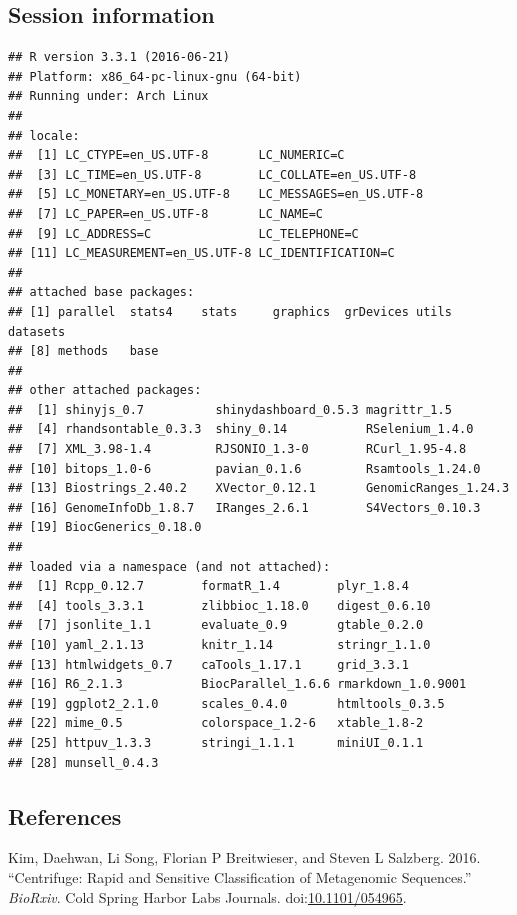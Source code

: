 \documentclass[]{article}
\begin{document}
\subsection{Session information}\label{session-information}

\begin{verbatim}
## R version 3.3.1 (2016-06-21)
## Platform: x86_64-pc-linux-gnu (64-bit)
## Running under: Arch Linux
## 
## locale:
##  [1] LC_CTYPE=en_US.UTF-8       LC_NUMERIC=C              
##  [3] LC_TIME=en_US.UTF-8        LC_COLLATE=en_US.UTF-8    
##  [5] LC_MONETARY=en_US.UTF-8    LC_MESSAGES=en_US.UTF-8   
##  [7] LC_PAPER=en_US.UTF-8       LC_NAME=C                 
##  [9] LC_ADDRESS=C               LC_TELEPHONE=C            
## [11] LC_MEASUREMENT=en_US.UTF-8 LC_IDENTIFICATION=C       
## 
## attached base packages:
## [1] parallel  stats4    stats     graphics  grDevices utils     datasets 
## [8] methods   base     
## 
## other attached packages:
##  [1] shinyjs_0.7          shinydashboard_0.5.3 magrittr_1.5        
##  [4] rhandsontable_0.3.3  shiny_0.14           RSelenium_1.4.0     
##  [7] XML_3.98-1.4         RJSONIO_1.3-0        RCurl_1.95-4.8      
## [10] bitops_1.0-6         pavian_0.1.6         Rsamtools_1.24.0    
## [13] Biostrings_2.40.2    XVector_0.12.1       GenomicRanges_1.24.3
## [16] GenomeInfoDb_1.8.7   IRanges_2.6.1        S4Vectors_0.10.3    
## [19] BiocGenerics_0.18.0 
## 
## loaded via a namespace (and not attached):
##  [1] Rcpp_0.12.7        formatR_1.4        plyr_1.8.4        
##  [4] tools_3.3.1        zlibbioc_1.18.0    digest_0.6.10     
##  [7] jsonlite_1.1       evaluate_0.9       gtable_0.2.0      
## [10] yaml_2.1.13        knitr_1.14         stringr_1.1.0     
## [13] htmlwidgets_0.7    caTools_1.17.1     grid_3.3.1        
## [16] R6_2.1.3           BiocParallel_1.6.6 rmarkdown_1.0.9001
## [19] ggplot2_2.1.0      scales_0.4.0       htmltools_0.3.5   
## [22] mime_0.5           colorspace_1.2-6   xtable_1.8-2      
## [25] httpuv_1.3.3       stringi_1.1.1      miniUI_0.1.1      
## [28] munsell_0.4.3
\end{verbatim}

\subsection*{References}\label{references}

\hypertarget{refs}{}
\hypertarget{ref-DKimux5fSSalzber2016-Biorxiv}{}
Kim, Daehwan, Li Song, Florian P Breitwieser, and Steven L Salzberg.
2016. ``Centrifuge: Rapid and Sensitive Classification of Metagenomic
Sequences.'' \emph{BioRxiv}. Cold Spring Harbor Labs Journals.
doi:\href{https://doi.org/10.1101/054965}{10.1101/054965}.
\end{document}
